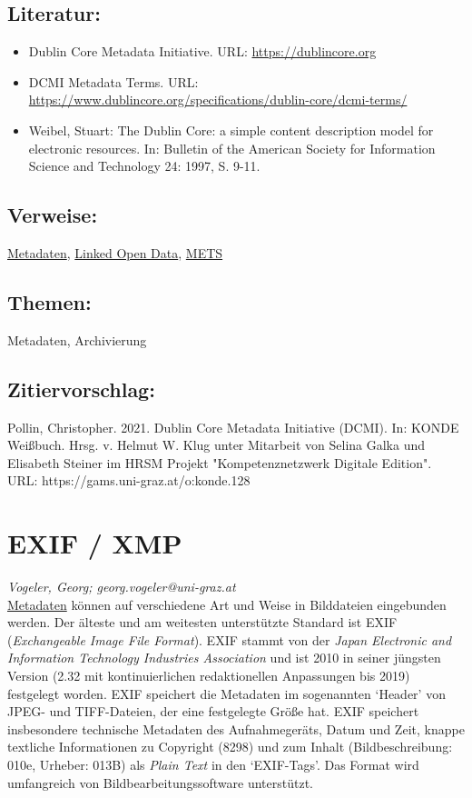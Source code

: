 \documentclass{article}
\begin{document}
        \subsection*{Literatur:}\begin{itemize}\item Dublin Core Metadata Initiative. URL: \url{https://dublincore.org}\item DCMI Metadata Terms. URL: \url{https://www.dublincore.org/specifications/dublin-core/dcmi-terms/}\item Weibel, Stuart: The Dublin Core: a simple content description model for electronic resources. In: Bulletin of the American Society for Information Science and Technology 24: 1997, S. 9-11.\end{itemize}\subsection*{Verweise:}\href{https://gams.uni-graz.at/o:konde.25}{Metadaten}, \href{https://gams.uni-graz.at/o:konde.8}{Linked Open Data}, \href{https://gams.uni-graz.at/o:konde.129}{METS}\subsection*{Themen:}Metadaten, Archivierung\subsection*{Zitiervorschlag:}Pollin, Christopher. 2021. Dublin Core Metadata Initiative (DCMI). In: KONDE Weißbuch. Hrsg. v. Helmut W. Klug unter Mitarbeit von Selina Galka und Elisabeth Steiner im HRSM Projekt "Kompetenznetzwerk Digitale Edition". URL: https://gams.uni-graz.at/o:konde.128\newpage\section*{EXIF / XMP} \emph{Vogeler, Georg; georg.vogeler@uni-graz.at}\\
        
    \href{http://gams.uni-graz.at/o:konde.25}{Metadaten} können auf verschiedene Art und Weise in Bilddateien eingebunden werden. Der älteste und am weitesten unterstützte Standard ist EXIF (\emph{Exchangeable Image File Format}). EXIF stammt von der \emph{Japan Electronic and Information Technology Industries Association} und ist 2010 in seiner jüngsten Version (2.32 mit kontinuierlichen redaktionellen Anpassungen bis 2019) festgelegt worden. EXIF speichert die Metadaten im sogenannten ‘Header’ von JPEG- und TIFF-Dateien, der eine festgelegte Größe hat. EXIF speichert insbesondere technische Metadaten des Aufnahmegeräts, Datum und Zeit, knappe textliche Informationen zu Copyright (8298) und zum Inhalt (Bildbeschreibung: 010e, Urheber: 013B) als \emph{Plain Text} in den ‘EXIF-Tags’. Das Format wird umfangreich von Bildbearbeitungssoftware unterstützt.\\
            
\end{document}

